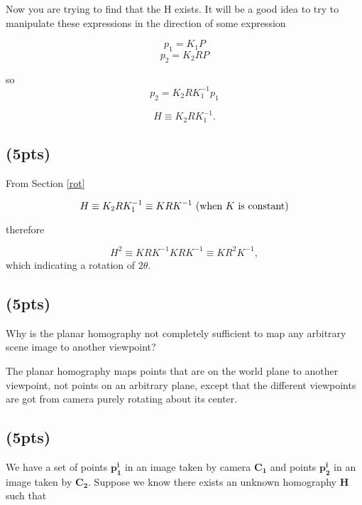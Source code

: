 \documentclass[12pt]{article}
\begin{document}
Now you are trying to find that the H exists. It will be a good idea to try to manipulate these expressions in the
direction of some expression

\begin{equation*}
  p_1 = K_1 P
\end{equation*}
\begin{equation}
  p_2 = K_2 R P
\end{equation}

so
\begin{equation*}
  p_2 = K_2 R K_1^{-1} p_1
\end{equation*}

\begin{equation}
  H \equiv K_2 R K_1^{-1}.
\end{equation}



\subsection{(5pts)}

From Section \ref{rot}

\begin{equation}
  H \equiv K_2 R K_1^{-1} \equiv K R K^{-1}\ (\textup{when $K$ is constant})
\end{equation}

therefore

\begin{equation}
  H^2 \equiv K R K^{-1} K R K^{-1} \equiv K R^2 K^{-1},
\end{equation}
which indicating a rotation of $2\theta$.

\subsection{(5pts)}

Why is the planar homography not completely sufficient to map any arbitrary scene image to another viewpoint?

The planar homography maps points that are on the world plane to another viewpoint, not points on an arbitrary plane, except that the different viewpoints are got from camera purely rotating about its center. 



\subsection{(5pts)}

We have a set of points $\bm{p^i_1}$ in an image taken by camera $\bm{C_1}$ and points $\bm{p^i_2}$ in an image taken by
$\bm{C_2}$. Suppose we know there exists an unknown homography $\bm{H}$ such that
\end{document}
